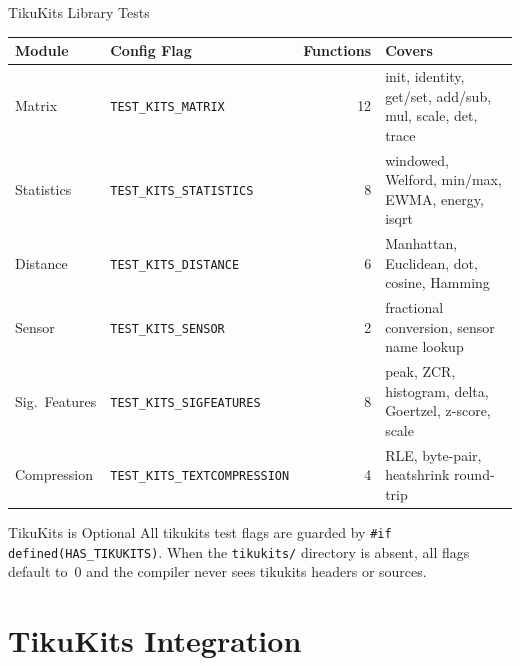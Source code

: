 \documentclass[aspectratio=169, 10pt]{beamer}
\begin{document}
\begin{frame}{TikuKits Library Tests}
\begin{table}
\centering
\small
\begin{tabular}{@{}llrl@{}}
\toprule
\textbf{Module} & \textbf{Config Flag} & \textbf{Functions} & \textbf{Covers} \\
\midrule
Matrix       & \texttt{TEST\_KITS\_MATRIX}       & 12 & init, identity, get/set, add/sub, mul, scale, det, trace \\
Statistics   & \texttt{TEST\_KITS\_STATISTICS}    & 8  & windowed, Welford, min/max, EWMA, energy, isqrt \\
Distance     & \texttt{TEST\_KITS\_DISTANCE}      & 6  & Manhattan, Euclidean, dot, cosine, Hamming \\
Sensor       & \texttt{TEST\_KITS\_SENSOR}        & 2  & fractional conversion, sensor name lookup \\
Sig.\ Features & \texttt{TEST\_KITS\_SIGFEATURES} & 8  & peak, ZCR, histogram, delta, Goertzel, z-score, scale \\
Compression  & \texttt{TEST\_KITS\_TEXTCOMPRESSION} & 4 & RLE, byte-pair, heatshrink round-trip \\
\bottomrule
\end{tabular}
\end{table}

\vspace{0.3em}
\begin{alertblock}{TikuKits is Optional}
All tikukits test flags are guarded by \texttt{\#if defined(HAS\_TIKUKITS)}.
When the \texttt{tikukits/} directory is absent, all flags default to~0
and the compiler never sees tikukits headers or sources.
\end{alertblock}
\end{frame}

\section{TikuKits Integration}
\end{document}

